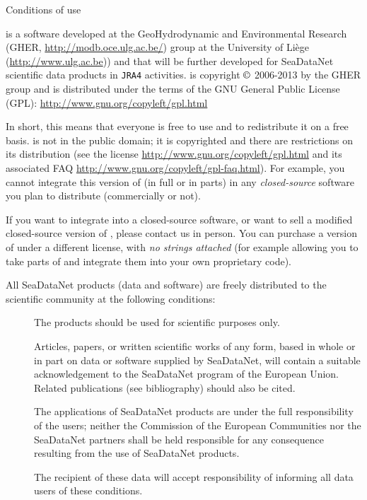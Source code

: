 
\vspace*{\fill}

\begin{center}
\begin{minipage}[c]{.85\textwidth}

\Large{Conditions of use}
\vspace{1cm}
\normalsize


\vspace{.25cm}
\diva is a software developed at the GeoHydrodynamic and Environmental Research (GHER, \url{http://modb.oce.ulg.ac.be/}) group at the University of Liège (\url{http://www.ulg.ac.be})) and that will be further developed for SeaDataNet scientific data products in \texttt{JRA4} activities. \diva is copyright $\copyright$  2006-2013 by the GHER group and is distributed under the terms of the GNU General Public License (GPL): \url{http://www.gnu.org/copyleft/gpl.html} 

In short, this means that everyone is free to use \diva and to redistribute it on a free basis. \diva is not in the public domain; it is copyrighted and there are restrictions on its distribution (see the license \url{http://www.gnu.org/copyleft/gpl.html} and its associated FAQ \url{http://www.gnu.org/copyleft/gpl-faq.html}). For example, you cannot integrate this version of \diva (in full or in parts) in any \textit{closed-source} software you plan to distribute (commercially or not).

If you want to integrate \diva into a closed-source software, or want to sell a modified closed-source version of \diva, please contact us in person. You can purchase a version of \diva under a different license, with \textit{no strings attached} (for example allowing you to take parts of \diva and integrate them into your own proprietary code).

\vspace{.25cm}
All SeaDataNet products (data and software) are freely distributed to the scientific community at the following conditions: 

\begin{description}
\item[\checkmark] The products should be used for scientific purposes only.
\item[\checkmark] Articles, papers, or written scientific works of any form, based in whole or in part on data or software supplied by SeaDataNet, will contain a suitable acknowledgement to the SeaDataNet program of the European Union. Related publications (see bibliography) should also be cited.
\item[\checkmark] The applications of SeaDataNet products are under the full responsibility of the users; neither the Commission of the European Communities nor the SeaDataNet partners shall be held responsible for any consequence resulting from the use of SeaDataNet products. 
\item[\checkmark] The recipient of these data will accept responsibility of informing all data users of these conditions.
\end{description}


\end{minipage}
\end{center}
